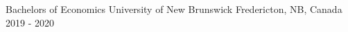 \begin{cventries}
  \cventry
    {Bachelors of Economics} %
    {University of New Brunswick} %
    {Fredericton, NB, Canada} %
    {2019 - 2020} %
    {
    }


\end{cventries}
